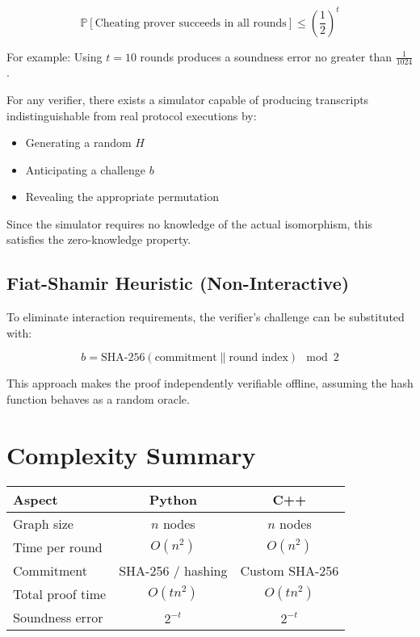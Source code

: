 \[
\mathbb{P}[\text{Cheating prover succeeds in all rounds}] \leq \left(\frac{1}{2}\right)^t
\]

For example:  
Using $t = 10$ rounds produces a soundness error no greater than $\frac{1}{1024}$.

For any verifier, there exists a simulator capable of producing transcripts indistinguishable from real protocol executions by:
\begin{itemize}
    \item Generating a random $H$
    \item Anticipating a challenge $b$
    \item Revealing the appropriate permutation
\end{itemize}

Since the simulator requires no knowledge of the actual isomorphism, this satisfies the zero-knowledge property.

\subsection*{Fiat-Shamir Heuristic (Non-Interactive)}

To eliminate interaction requirements, the verifier's challenge can be substituted with:

\[
b = \text{SHA-256}(\text{commitment} \parallel \text{round index}) \mod 2
\]

This approach makes the proof independently verifiable offline, assuming the hash function behaves as a random oracle.

\section*{Complexity Summary}

\begin{tabular}{|l|c|c|}
\hline
\textbf{Aspect} & \textbf{Python} & \textbf{C++} \\
\hline
Graph size & $n$ nodes & $n$ nodes \\
Time per round & $O(n^2)$ & $O(n^2)$ \\
Commitment & SHA-256 / hashing & Custom SHA-256 \\
Total proof time & $O(tn^2)$ & $O(tn^2)$ \\
Soundness error & $2^{-t}$ & $2^{-t}$ \\
\hline
\end{tabular}
